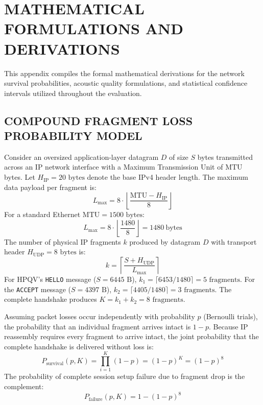 \chapter{MATHEMATICAL FORMULATIONS AND DERIVATIONS}
\label{app:math}

This appendix compiles the formal mathematical derivations for the network survival probabilities, acoustic quality formulations, and statistical confidence intervals utilized throughout the evaluation.

\section{COMPOUND FRAGMENT LOSS PROBABILITY MODEL}
Consider an oversized application-layer datagram $D$ of size $S$ bytes transmitted across an IP network interface with a Maximum Transmission Unit of $\text{MTU}$ bytes. Let $H_{\text{IP}} = 20\text{ bytes}$ denote the base IPv4 header length. The maximum data payload per fragment is:
\begin{equation}
    L_{\text{max}} = 8 \cdot \left\lfloor \frac{\text{MTU} - H_{\text{IP}}}{8} \right\rfloor
\end{equation}
For a standard Ethernet $\text{MTU} = 1500\text{ bytes}$:
\begin{equation}
    L_{\text{max}} = 8 \cdot \left\lfloor \frac{1480}{8} \right\rfloor = 1480\ \text{bytes}
\end{equation}
The number of physical IP fragments $k$ produced by datagram $D$ with transport header $H_{\text{UDP}} = 8\text{ bytes}$ is:
\begin{equation}
    k = \left\lceil \frac{S + H_{\text{UDP}}}{L_{\text{max}}} \right\rceil
\end{equation}
For HPQV's \texttt{HELLO} message ($S = 6445\text{ B}$), $k_1 = \lceil 6453 / 1480 \rceil = 5\text{ fragments}$. For the \texttt{ACCEPT} message ($S = 4397\text{ B}$), $k_2 = \lceil 4405 / 1480 \rceil = 3\text{ fragments}$. The complete handshake produces $K = k_1 + k_2 = 8\text{ fragments}$.

Assuming packet losses occur independently with probability $p$ (Bernoulli trials), the probability that an individual fragment arrives intact is $1 - p$. Because IP reassembly requires every fragment to arrive intact, the joint probability that the complete handshake is delivered without loss is:
\begin{equation}
    P_{\text{survival}}(p, K) = \prod_{i=1}^K (1 - p) = (1 - p)^K = (1 - p)^8
\end{equation}
The probability of complete session setup failure due to fragment drop is the complement:
\begin{equation}
    P_{\text{failure}}(p, K) = 1 - (1 - p)^8
\end{equation}

